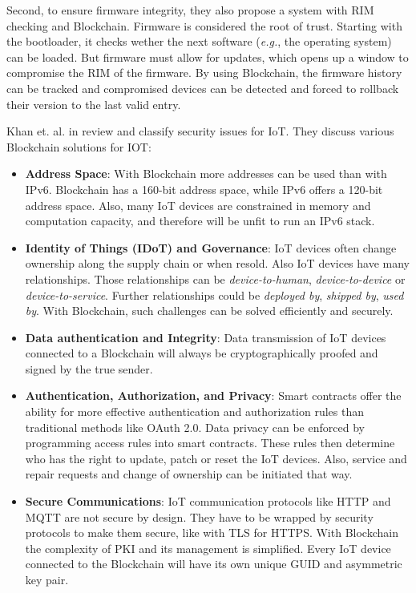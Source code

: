 Second, to ensure firmware integrity, they also propose a system with RIM checking and Blockchain.
Firmware is considered the root of trust. Starting with the bootloader, it checks wether the next software (\textit{e.g.}, the operating system) can be loaded.
But firmware must allow for updates, which opens up a window to compromise the RIM of the firmware. By using Blockchain, the firmware history can be tracked and compromised devices can be detected and forced to rollback their
version to the last valid entry.

Khan et. al. in \cite{Khan2018} review and classify security issues for IoT. They discuss various Blockchain solutions for IOT:

\begin{itemize}
  \item {\textbf{Address Space}: With Blockchain more addresses can be used than with IPv6. Blockchain has a 160-bit address space, while IPv6 offers a 120-bit address space.
  Also, many IoT devices are constrained in memory and computation capacity, and therefore will be unfit to run an IPv6 stack.}
  \item {\textbf{Identity of Things (IDoT) and Governance}: IoT devices often change ownership along the supply chain or when resold. Also IoT devices have many relationships. Those relationships can be \textit{device-to-human}, \textit{device-to-device} or \textit{device-to-service}. Further relationships could be \textit{deployed by}, \textit{shipped by}, \textit{used by}. With Blockchain, such challenges can be solved efficiently and securely.}
  \item {\textbf{Data authentication and Integrity}: Data transmission of IoT devices connected to a Blockchain will always be  cryptographically proofed and signed by the true sender.}
  \item {\textbf{Authentication, Authorization, and Privacy}: Smart contracts offer the ability for more effective authentication and authorization rules than traditional methods like OAuth 2.0. Data privacy can be enforced by programming access rules into smart contracts. These rules then determine who has the right to update, patch or reset the IoT devices. Also, service and repair requests and change of ownership can be initiated that way. }
  \item {\textbf{Secure Communications}: IoT communication protocols like HTTP and MQTT are not secure by design. They have to be wrapped by security protocols to make them secure, like with TLS for HTTPS.
  With Blockchain the complexity of PKI and its management is simplified. Every IoT device connected to the Blockchain will have its own unique GUID and asymmetric key pair. }
\end{itemize}



